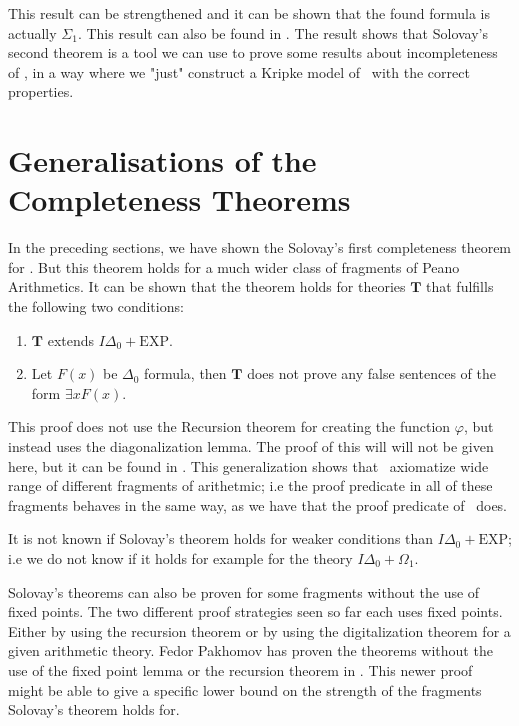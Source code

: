 \documentclass[../main.tex]{subfiles}
\begin{document}
This result can be strengthened and it can be shown that the found formula is
actually $\Sigma_1$. This result can also be found in \parencite{Smor1985}.
The result shows that Solovay's second theorem is a tool we can use to prove
some results about incompleteness of \PRA, in a way where we "just" construct a
Kripke model of \GL\ with the correct properties.
\section{Generalisations  of the Completeness Theorems}

In the preceding sections, we have shown the Solovay's first completeness theorem for \PRA.
But this theorem holds for a much wider class of fragments of Peano
Arithmetics. It can be shown that the theorem holds for
theories $\textbf{T}$ that fulfills the following two conditions:
\begin{enumerate}
	\item $\textbf{T}$ extends $I\Delta_0+\text{EXP}$.
	\item Let $F(x)$ be $ \Delta_0$ formula, then $\textbf{T}$ does not prove any
		false sentences of the form $\exists x F(x)$.
\end{enumerate}

This proof does not use the Recursion theorem for creating the function
$\varphi$, but instead uses the diagonalization lemma. The
proof of this will will not be given here, but it can be found in
\parencite{Dick1991}. This generalization shows that \GL\ axiomatize wide
range of different fragments of arithetmic; i.e the proof predicate in all of
these fragments behaves in the same way, as we have that the proof predicate of
\PRA\ does.

It is not known if Solovay's theorem holds for weaker conditions than
$I\Delta_0+\text{EXP}$; i.e we do not know if it holds for example for the theory
$I\Delta_0+\Omega_1$.



Solovay's theorems can also be proven for some fragments without the use of
fixed points. The two different proof strategies seen so far each uses fixed
points. Either by using the recursion theorem or by using the digitalization
theorem for a given arithmetic theory. Fedor Pakhomov has proven the theorems
without the use of the fixed point lemma or the recursion theorem in
\parencite{Fedo2017}. This
newer proof might be able to give a specific lower bound on the strength of
the fragments Solovay's theorem holds for.
\end{document}
